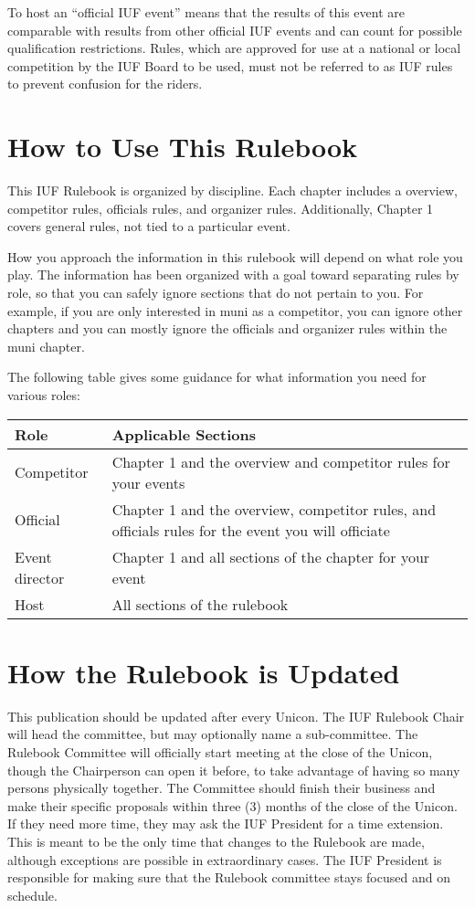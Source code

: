 To host an ``official IUF event'' means that the results of this event are comparable with results from other official IUF events and can count for possible qualification restrictions.
Rules, which are approved for use at a national or local competition by the IUF Board to be used, must not be referred to as IUF rules to prevent confusion for the riders.

\section{How to Use This Rulebook}

This IUF Rulebook is organized by discipline.
Each chapter includes a overview, competitor rules, officials rules, and organizer rules.
Additionally, Chapter 1 covers general rules, not tied to a particular event.

How you approach the information in this rulebook will depend on what role you play.
The information has been organized with a goal toward separating rules by role, so that you can safely ignore sections that do not pertain to you.
For example, if you are only interested in muni as a competitor, you can ignore other chapters and you can mostly ignore the officials and organizer rules within the muni chapter.

The following table gives some guidance for what information you need for various roles:

\begin{longtable}{|l|p{8cm}|}
\hline
\textbf{Role} & \textbf{Applicable Sections} \\
\hline
Competitor & Chapter 1 and the overview and competitor rules for your events\\
\hline
Official & Chapter 1 and the overview, competitor rules, and officials rules for the event you will officiate\\
\hline
Event director & Chapter 1 and all sections of the chapter for your event \\
\hline
Host & All sections of the rulebook\\
\hline
\end{longtable}

\section{How the Rulebook is Updated}

This publication should be updated after every Unicon.
The IUF Rulebook Chair will head the committee, but may optionally name a sub-committee.
The Rulebook Committee will officially start meeting at the close of the Unicon, though the Chairperson can open it before, to take advantage of having so many persons physically together.
The Committee should finish their business and make their specific proposals within three (3) months of the close of the Unicon.
If they need more time, they may ask the IUF President for a time extension.
This is meant to be the only time that changes to the Rulebook are made, although exceptions are possible in extraordinary cases.
The IUF President is responsible for making sure that the Rulebook committee stays focused and on schedule.

